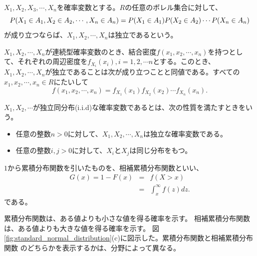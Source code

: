 \begin{defi}
 $X_1,X_2,X_3,\cdots,X_n$を確率変数とする。$R$の任意のボレル集合に対して、
 \begin{equation*}
  P(X_1 \in A_1, X_2 \in A_2,\cdots, X_n \in A_n) = P(X_1 \in A_1)P(X_2\in A_2)\cdots P(X_n \in A_n)\\
 \end{equation*}
が成り立つならば、$X_1,X_2,\cdots,X_n$は独立であるという。
\end{defi}

\begin{theo}
 $X_1,X_2,\cdots,X_n$が連続型確率変数のとき、結合密度$f(x_1,x_2,\cdots,x_n)$を持つとして、それぞれの周辺密度を$f_{X_i}(x_i),i=1,2,\cdots n$とする。このとき、$X_1,X_2,\cdots,X_n$が独立であることは次が成り立つことと同値である。すべての$x_1,x_2,\cdots, x_n \in R$にたいして
 \begin{equation*}
  f(x_1,x_2,\cdots,x_n) = f_{X_1}(x_1)f_{X_2}(x_2)\cdots f_{X_n}(x_n).
 \end{equation*}
\end{theo}


\begin{defi}
 $X_1,X_2,\cdots$が独立同分布(i.i.d)な確率変数であるとは、次の性質を満たすときをいう。
 \begin{itemize}
  \item 任意の整数$n>0$に対して、$X_1,X_2,\cdots,X_n$は独立な確率変数である。
  \item 任意の整数$i,j>0$に対して、$X_i$と$X_j$は同じ分布をもつ。
 \end{itemize}
\end{defi}


\begin{defi}
 $1$から累積分布関数を引いたものを、相補累積分布関数といい、
 \begin{eqnarray}
  G(x)=1-F(x) &=& f(X>x) \\
  &=& \int_{x}^{\infty} f(z)dz.
 \end{eqnarray}
 である。
\end{defi}
累積分布関数は、ある値よりも小さな値を得る確率を示す。
相補累積分布関数は、ある値よりも大きな値を得る確率を示す。
図\ref{fig:standard_normal_distribution}(c)に図示した。累積分布関数と相補累積分布関数
のどちらかを表示するかは、分野によって異なる。



